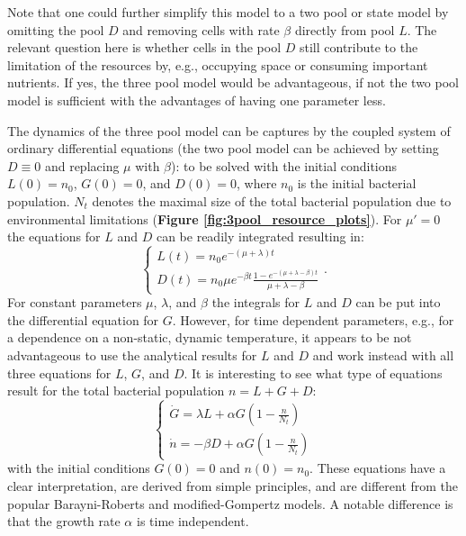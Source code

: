 \documentclass[10pt,A4paper]{article}
\begin{document}
Note that one could further simplify this model to a two pool or state model by omitting the pool $D$ and removing cells with rate $\beta$ directly from pool $L$. 
The relevant question here is whether cells in the pool $D$ still contribute to the limitation of the resources by, e.g., occupying space or consuming important nutrients. 
If yes, the three pool model would be advantageous, if not the two pool model is sufficient with the advantages of having one parameter less.

The dynamics of the three pool model can be captures by the coupled system of ordinary differential equations (the two pool model can be achieved by setting $D\equiv 0$ and replacing $\mu$ with $\beta$):
to be solved with the initial conditions $L(0)=n_0$, $G(0)=0$, and $D(0)=0$, where $n_0$ is the initial bacterial population. 
$N_t$ denotes the maximal size of the total bacterial population due to environmental limitations (\textbf{Figure \ref{fig:3pool_resource_plots}}). 
For $\mu'=0$ the equations for $L$ and $D$ can be readily integrated resulting in:
\begin{equation}
    \begin{cases}
        L(t) = n_0 e^{-(\mu+\lambda)t}\\
        D(t) = n_0 \mu e^{-\beta t}\frac{1-e^{-(\mu+\lambda-\beta)t}}{\mu+\lambda-\beta}
    \end{cases}.
\end{equation}
For constant parameters $\mu$, $\lambda$, and $\beta$ the integrals for $L$ and $D$ can be put into the differential equation for $G$. 
However, for time dependent parameters, e.g., for a dependence on a non-static, dynamic temperature, it appears to be not advantageous to use the analytical results for $L$ and $D$ and work instead with all three equations for $L$, $G$, and $D$. 
It is interesting to see what type of equations result for the total bacterial population $n=L+G+D$:
\begin{equation}
    \begin{cases}
        \dot{G} = \lambda L + \alpha G\left(1-\frac{n}{N_t}\right)\\
        \dot{n} = - \beta D + \alpha G\left(1-\frac{n}{N_t}\right)
    \end{cases}
\end{equation}
with the initial conditions $G(0)=0$ and $n(0)=n_0$. 
These equations have a clear interpretation, are derived from simple principles, and are different from the popular Barayni-Roberts and modified-Gompertz models. 
A notable difference is that the growth rate $\alpha$ is time independent. 
\end{document}
